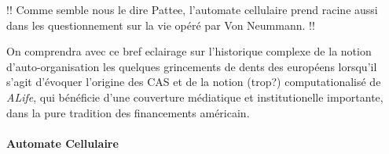

!! Comme semble nous le dire Pattee, l'automate cellulaire prend racine aussi dans les questionnement sur la vie opéré par Von Neummann. !!

On comprendra avec ce bref eclairage sur l'historique complexe de la notion d'auto-organisation les quelques grincements de dents des européens \autocite{Varela1995} lorsqu'il s'agit d'évoquer l'origine des CAS et de la notion (trop?) computationalisé de \textit{ALife}, qui bénéficie d'une couverture médiatique et institutionelle importante, dans la pure tradition des financements américain.  



\paragraph{Automate Cellulaire}

